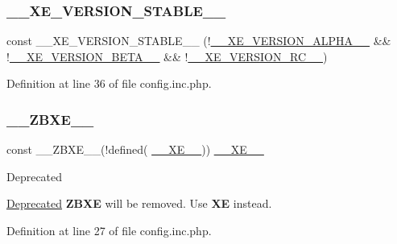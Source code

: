 \subsubsection{\texorpdfstring{\+\_\+\+\_\+\+X\+E\+\_\+\+V\+E\+R\+S\+I\+O\+N\+\_\+\+S\+T\+A\+B\+L\+E\+\_\+\+\_\+}{\_\_XE\_VERSION\_STABLE\_\_}}
{\footnotesize\ttfamily const \+\_\+\+\_\+\+X\+E\+\_\+\+V\+E\+R\+S\+I\+O\+N\+\_\+\+S\+T\+A\+B\+L\+E\+\_\+\+\_\+ (!\hyperlink{config_8inc_8php_aaee982ed748e379cde978edfe8d433e1}{\+\_\+\+\_\+\+X\+E\+\_\+\+V\+E\+R\+S\+I\+O\+N\+\_\+\+A\+L\+P\+H\+A\+\_\+\+\_\+} \&\& !\hyperlink{config_8inc_8php_aac8a83557f3eab1d2d2583fe21559ca9}{\+\_\+\+\_\+\+X\+E\+\_\+\+V\+E\+R\+S\+I\+O\+N\+\_\+\+B\+E\+T\+A\+\_\+\+\_\+} \&\& !\hyperlink{config_8inc_8php_a1d41a8e68af4b70491bdb523ccb57ac2}{\+\_\+\+\_\+\+X\+E\+\_\+\+V\+E\+R\+S\+I\+O\+N\+\_\+\+R\+C\+\_\+\+\_\+})}



Definition at line 36 of file config.\+inc.\+php.

\mbox{\label{config_8inc_8php_ae848adb762a4ccb36ec779012a4cc08a}} 
\subsubsection{\texorpdfstring{\+\_\+\+\_\+\+Z\+B\+X\+E\+\_\+\+\_\+}{\_\_ZBXE\_\_}}
{\footnotesize\ttfamily const \+\_\+\+\_\+\+Z\+B\+X\+E\+\_\+\+\_\+(!defined( \textquotesingle{}\hyperlink{index_8php_a697de427d83b791899ae45d555377756}{\+\_\+\+\_\+\+X\+E\+\_\+\+\_\+}\textquotesingle{})) \hyperlink{index_8php_a697de427d83b791899ae45d555377756}{\+\_\+\+\_\+\+X\+E\+\_\+\+\_\+}}

\begin{DoxyRefDesc}{Deprecated}
\item[\hyperlink{deprecated__deprecated000011}{Deprecated}]{\bfseries Z\+B\+XE} will be removed. Use {\bfseries XE} instead. \end{DoxyRefDesc}


Definition at line 27 of file config.\+inc.\+php.

\mbox{\label{config_8inc_8php_a0e70c145bf3712e075af5c3861045dc9}} 
